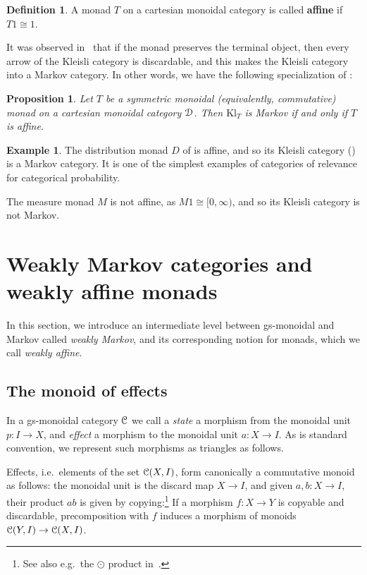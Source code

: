 \documentclass[a4paper,UKenglish,numberwithinsect,cleveref, autoref, thm-restate]{lipics-v2021}
\theoremstyle{plain} %
\newtheorem{myproposition}[mytheorem]{Proposition}
\theoremstyle{definition} %
\newtheorem{mydefinition}[mytheorem]{Definition}
\newtheorem{myexample}[mytheorem]{Example}
\begin{document}
\begin{mydefinition}
 A monad $T$ on a cartesian monoidal category is called \textbf{affine} if $T1\cong 1$.
\end{mydefinition}

It was observed in~\cite[Corollary~3.2]{Fritz_2020} that if the monad preserves the terminal object, then every arrow of the Kleisli category is discardable, and this makes the Kleisli category into a Markov category.
In other words, we have the following specialization of :

\begin{myproposition}\label{affinemarkov}
Let $T$ be a symmetric monoidal (equivalently, commutative) monad on a cartesian monoidal category $\mathcal{D}$. Then $\mathrm{Kl}_T$ is Markov if and only if $T$ is affine.
\end{myproposition}
 
 
\begin{myexample}
 The distribution monad $D$ of  is affine, and so its Kleisli category () is a Markov category. It is one of the simplest examples of categories of relevance for categorical probability.
 
 The measure monad $M$ is not affine, as $M1\cong[0,\infty)$, and so its Kleisli category is not Markov.
\end{myexample}


\section{Weakly Markov categories and weakly affine monads}

In this section, we introduce an intermediate level between gs-monoidal and Markov called \emph{weakly Markov}, and its corresponding notion for monads, which we call \emph{weakly affine}.

\subsection{The monoid of effects}\label{monoids}

In a gs-monoidal category $\mathcal{C}$ we call a \emph{state} a morphism from the monoidal unit $p:I\to X$, and \emph{effect} a morphism to the monoidal unit $a:X\to I$.
As is standard convention, we represent such morphisms as triangles as follows.

 Effects, i.e.~elements of the set $\mathcal{C}(X,I)$, form canonically a commutative monoid as follows: the monoidal unit is the discard map $X\to I$, and given $a,b:X\to I$, their product $ab$ is given by copying:\footnote{See also e.g.~the $\odot$ product in~\cite[Proposition~3.10]{coecke2011phasegroups}.}
If a morphism $f:X\to Y$ is copyable and discardable, precomposition with $f$ induces a morphism of monoids $\mathcal{C}(Y,I)\to\mathcal{C}(X,I)$. 
\end{document}
